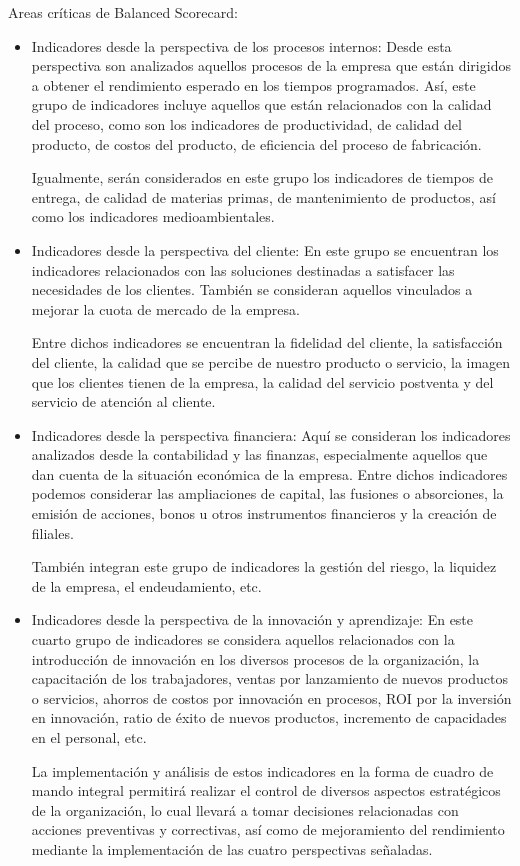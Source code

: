 \documentclass[preprint,12pt]{elsarticle}
\begin{document}
Areas críticas de Balanced Scorecard:
		\begin{itemize}
		\item Indicadores desde la perspectiva de los procesos internos: Desde esta perspectiva son analizados aquellos procesos de la empresa que están dirigidos a obtener el rendimiento esperado en los tiempos programados. Así, este grupo de indicadores incluye aquellos que están relacionados con la calidad del proceso, como son los indicadores de productividad, de calidad del producto, de costos del producto, de eficiencia del proceso de fabricación.

Igualmente, serán considerados en este grupo los indicadores de tiempos de entrega, de calidad de materias primas, de mantenimiento de productos, así como los indicadores medioambientales.
		\item Indicadores desde la perspectiva del cliente: En este grupo se encuentran los indicadores relacionados con las soluciones destinadas a satisfacer las necesidades de los clientes. También se consideran aquellos vinculados a mejorar la cuota de mercado de la empresa.

Entre dichos indicadores se encuentran la fidelidad del cliente, la satisfacción del cliente, la calidad  que se percibe de nuestro producto o servicio, la imagen que los clientes tienen de la empresa, la calidad del servicio postventa y del servicio de atención al cliente.

		\item Indicadores desde la perspectiva financiera: Aquí se consideran los indicadores analizados desde la contabilidad y las finanzas, especialmente aquellos que dan cuenta de la situación económica de la empresa. Entre dichos indicadores podemos considerar las ampliaciones de capital, las fusiones o absorciones, la emisión de acciones, bonos u otros instrumentos financieros y la creación de filiales.

También integran este grupo de indicadores la gestión del riesgo, la liquidez de la empresa, el endeudamiento, etc.

		\item Indicadores desde la perspectiva de la innovación y aprendizaje: En este cuarto grupo de indicadores se considera aquellos relacionados con la introducción de innovación en los diversos procesos de la organización, la capacitación de los trabajadores, ventas por lanzamiento de nuevos productos o servicios, ahorros de costos por innovación en procesos, ROI por la inversión en innovación, ratio de éxito de nuevos productos, incremento de capacidades en el personal, etc.

La implementación y análisis de estos indicadores en la forma de cuadro de mando integral permitirá realizar el control de diversos aspectos estratégicos de la organización, lo cual llevará a tomar decisiones relacionadas con acciones preventivas y correctivas, así como de mejoramiento del rendimiento mediante la implementación de las cuatro perspectivas señaladas.
	\end{itemize}
\end{document}
